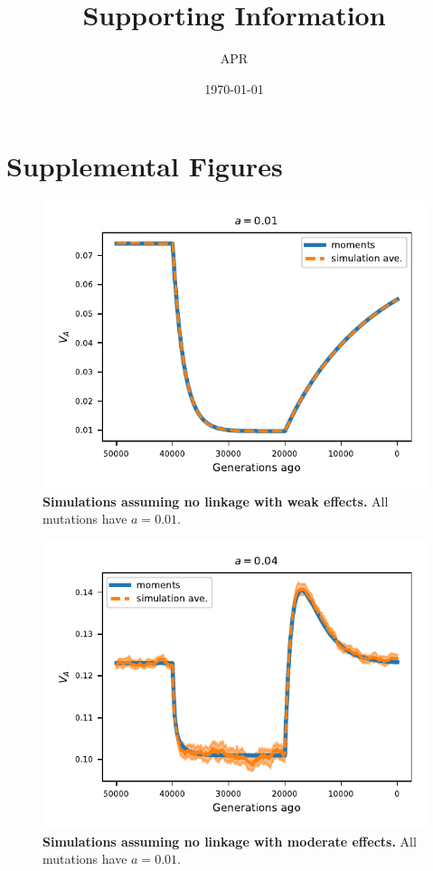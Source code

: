 \documentclass[]{article}
\title{Supporting Information}
\author{APR}
\date{\today}
\begin{document}
\maketitle

\renewcommand{\thepage}{S\arabic{page}}
\renewcommand{\thesection}{S\arabic{section}}
\renewcommand{\thetable}{S\arabic{table}}
\renewcommand{\thefigure}{S\arabic{figure}}

\section{Supplemental Figures}

\begin{figure}[ht!]
    \centering
    \includegraphics{../figures/one_pop.a_0.01.pdf}
    \caption{
        \textbf{Simulations assuming no linkage with weak effects.}
        All mutations have $a=0.01$.
    }
    \label{fig:one-popA}
\end{figure}

\begin{figure}[ht!]
    \centering
    \includegraphics{../figures/one_pop.a_0.04.pdf}
    \caption{
        \textbf{Simulations assuming no linkage with moderate effects.}
        All mutations have $a=0.01$.
    }
    \label{fig:one-popB}
\end{figure}
\end{document}
